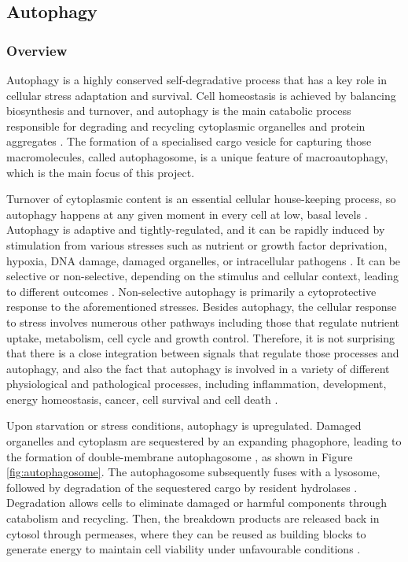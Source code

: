     
    
    
    
    
    
    
        
        
        
     \newpage   
    \subsection{Autophagy}
    
    \subsubsection{Overview}

    Autophagy is a highly conserved self-degradative process that has a key role in cellular stress adaptation and survival. Cell homeostasis is achieved by balancing biosynthesis and turnover, and autophagy is the main catabolic process responsible for degrading and recycling cytoplasmic organelles and protein aggregates \cite{Feng2015}. The formation of a specialised cargo vesicle for capturing those macromolecules, called autophagosome, is a unique feature of macroautophagy, which is the main focus of this project. 

    Turnover of cytoplasmic content is an essential cellular house-keeping process, so autophagy happens at any given moment in every cell at low, basal levels \cite{levine2008autophagy}. Autophagy is adaptive and tightly-regulated, and it can be rapidly induced by stimulation from various stresses such as nutrient or growth factor deprivation, hypoxia, DNA damage, damaged organelles, or intracellular pathogens \cite{Kroemer2010}. It can be selective or non-selective, depending on the stimulus and cellular context, leading to different outcomes \cite{Feng2015}. Non-selective autophagy is primarily a cytoprotective response to the aforementioned stresses. 
    Besides autophagy, the cellular response to stress involves numerous other pathways including those that regulate nutrient uptake, metabolism, cell cycle and growth control. Therefore, it is not surprising that there is a close integration between signals that regulate those processes and autophagy, and also the fact that autophagy is involved in a variety of different physiological and pathological processes, including inflammation, development, energy homeostasis, cancer, cell survival and cell death \cite{levine2008autophagy}.

    Upon starvation or stress conditions, autophagy is upregulated. Damaged organelles and cytoplasm are sequestered by an expanding phagophore, leading to the formation of double-membrane autophagosome \cite{Feng2015}, as shown in Figure \ref{fig:autophagosome}. The autophagosome subsequently fuses with a lysosome, followed by degradation of the sequestered cargo by resident hydrolases \cite{Yorimitsu2005Autophagy:Self-eating}. Degradation allows cells to eliminate damaged or harmful components through catabolism and recycling. Then, the breakdown products are released back in cytosol through permeases, where they can be reused as building blocks to generate energy to maintain cell viability under unfavourable conditions \cite{Feng2013TheMacroautophagy}. 


